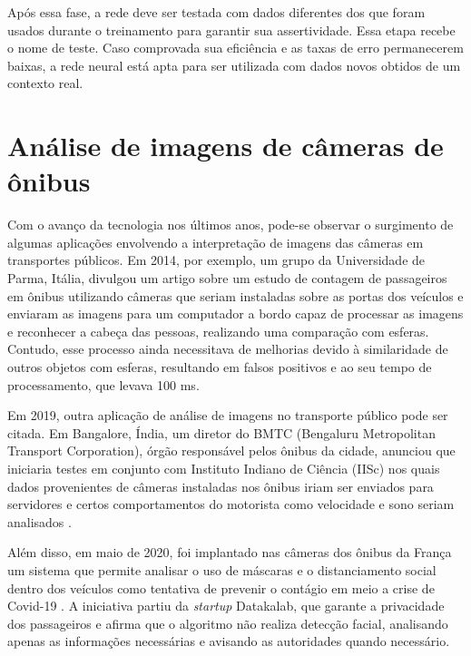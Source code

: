 \par Após essa fase, a rede deve ser testada com dados diferentes dos que foram usados durante o treinamento para garantir sua assertividade. Essa etapa recebe o nome de teste. Caso comprovada sua eficiência e as taxas de erro permanecerem baixas, a rede neural está apta para ser utilizada com dados novos obtidos de um contexto real.



\section{Análise de imagens de câmeras de ônibus}

\indent
\par Com o avanço da tecnologia nos últimos anos, pode-se observar o surgimento de algumas aplicações envolvendo a interpretação de imagens das câmeras em transportes públicos. Em 2014, por exemplo, um grupo da Universidade de Parma, Itália, divulgou um artigo \cite{Bernini2014} sobre um estudo de contagem de passageiros em ônibus utilizando câmeras que seriam instaladas sobre as portas dos veículos e enviaram as imagens para um computador a bordo capaz de processar as imagens e reconhecer a cabeça das pessoas, realizando uma comparação com esferas. Contudo, esse processo ainda necessitava de melhorias devido à similaridade de outros objetos com esferas, resultando em falsos positivos e ao seu tempo de processamento, que levava 100 ms.

\par Em 2019, outra aplicação de análise de imagens no transporte público pode ser citada. Em Bangalore, Índia,  um diretor do BMTC (Bengaluru Metropolitan Transport Corporation), órgão responsável pelos ônibus da cidade, anunciou que iniciaria testes em conjunto com Instituto Indiano de Ciência (IISc) nos quais dados provenientes de câmeras instaladas nos ônibus iriam ser enviados para servidores e certos comportamentos do motorista como velocidade e sono seriam analisados \cite{Prasad2019}.

\par Além disso, em maio de 2020, foi implantado nas câmeras dos ônibus da França um sistema que permite analisar o uso de máscaras e o distanciamento social dentro dos veículos como tentativa de prevenir o contágio em meio a crise de Covid-19 \cite{BBC2020}. A iniciativa partiu da \textit{startup} Datakalab, que garante a privacidade dos passageiros e afirma que o algoritmo não realiza detecção facial, analisando apenas as informações necessárias e avisando as autoridades quando necessário.

